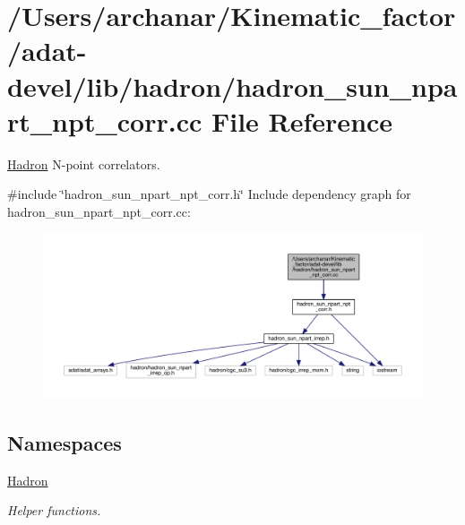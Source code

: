 \hypertarget{adat-devel_2lib_2hadron_2hadron__sun__npart__npt__corr_8cc}{}\section{/\+Users/archanar/\+Kinematic\+\_\+factor/adat-\/devel/lib/hadron/hadron\+\_\+sun\+\_\+npart\+\_\+npt\+\_\+corr.cc File Reference}
\label{adat-devel_2lib_2hadron_2hadron__sun__npart__npt__corr_8cc}


\mbox{\hyperlink{namespaceHadron}{Hadron}} N-\/point correlators.  


{\ttfamily \#include \char`\"{}hadron\+\_\+sun\+\_\+npart\+\_\+npt\+\_\+corr.\+h\char`\"{}}\newline
Include dependency graph for hadron\+\_\+sun\+\_\+npart\+\_\+npt\+\_\+corr.\+cc\+:
\nopagebreak
\begin{figure}[H]
\begin{center}
\leavevmode
\includegraphics[width=350pt]{d3/dbb/adat-devel_2lib_2hadron_2hadron__sun__npart__npt__corr_8cc__incl}
\end{center}
\end{figure}
\subsection*{Namespaces}
\begin{DoxyCompactItemize}
\item 
 \mbox{\hyperlink{namespaceHadron}{Hadron}}
\begin{DoxyCompactList}\small\item\em Helper functions. \end{DoxyCompactList}\end{DoxyCompactItemize}
